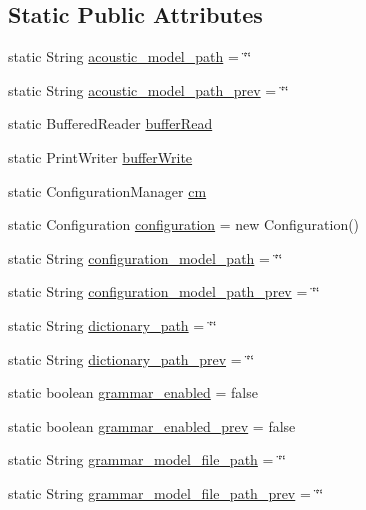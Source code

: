 \subsection*{Static Public Attributes}
\begin{DoxyCompactItemize}
\item 
static String \hyperlink{classSphinx4_a675a67b1705cd6ec01bb1e9447d588d4}{acoustic\-\_\-model\-\_\-path} = \char`\"{}\char`\"{}
\item 
static String \hyperlink{classSphinx4_a63b3cf1a9479a86d69526b34e3975b8c}{acoustic\-\_\-model\-\_\-path\-\_\-prev} = \char`\"{}\char`\"{}
\item 
static Buffered\-Reader \hyperlink{classSphinx4_a60e71ecb19da1d08a0c2d71b0f6ac875}{buffer\-Read}
\item 
static Print\-Writer \hyperlink{classSphinx4_aa3a9b95c9245e791f4d8e04b157372ca}{buffer\-Write}
\item 
static Configuration\-Manager \hyperlink{classSphinx4_a227104f3b942fde3f279ee54a700772d}{cm}
\item 
static Configuration \hyperlink{classSphinx4_adad3fb0b68649c440cabe47895a53e27}{configuration} = new Configuration()
\item 
static String \hyperlink{classSphinx4_aa403d02afb54d7c774c4ec53770a567c}{configuration\-\_\-model\-\_\-path} = \char`\"{}\char`\"{}
\item 
static String \hyperlink{classSphinx4_aaa4c30258a2c98605fc05ab3e50c20ca}{configuration\-\_\-model\-\_\-path\-\_\-prev} = \char`\"{}\char`\"{}
\item 
static String \hyperlink{classSphinx4_a1c5ef308a94ee2d15c6856c676206ba4}{dictionary\-\_\-path} = \char`\"{}\char`\"{}
\item 
static String \hyperlink{classSphinx4_a3c079ed40372dcc0cda65345cda22325}{dictionary\-\_\-path\-\_\-prev} = \char`\"{}\char`\"{}
\item 
static boolean \hyperlink{classSphinx4_a20f0d9d8646e97cd64d675957eb0a8ec}{grammar\-\_\-enabled} = false
\item 
static boolean \hyperlink{classSphinx4_a3830508de85cfcde2b71c019b9b645da}{grammar\-\_\-enabled\-\_\-prev} = false
\item 
static String \hyperlink{classSphinx4_a3913defdceb57d6ecd4dca0e2d83f4b9}{grammar\-\_\-model\-\_\-file\-\_\-path} = \char`\"{}\char`\"{}
\item 
static String \hyperlink{classSphinx4_aed95605805711285385e0baa12c5d1dd}{grammar\-\_\-model\-\_\-file\-\_\-path\-\_\-prev} = \char`\"{}\char`\"{}

\end{DoxyCompactItemize}
